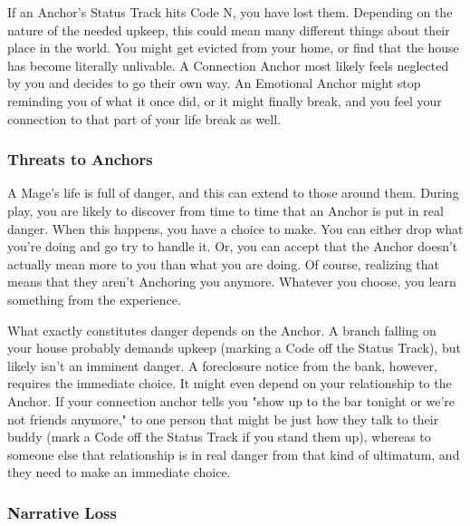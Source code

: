 \documentclass[
  oneside,
  statementpaper,
  9pt]{memoir}
\begin{document}
\begin{Player}

If an Anchor’s Status Track hits Code N, you have lost them. Depending on the nature of the needed upkeep, this could mean many different things about their place in the world. You might get evicted from your home, or find that the house has become literally unlivable. A Connection Anchor most likely feels neglected by you and decides to go their own way. An Emotional Anchor might stop reminding you of what it once did, or it might finally break, and you feel your connection to that part of your life break as well.

\end{Player}

\hypertarget{threats-to-anchors}{%
\subsubsection{Threats to Anchors}\label{threats-to-anchors}}

\begin{Player}

A Mage’s life is full of danger, and this can extend to those around them. During play, you are likely to discover from time to time that an Anchor is put in real danger. When this happens, you have a choice to make. You can either drop what you’re doing and go try to handle it. Or, you can accept that the Anchor doesn’t actually mean more to you than what you are doing. Of course, realizing that means that they aren’t Anchoring you anymore. Whatever you choose, you learn something from the experience.

What exactly constitutes danger depends on the Anchor. A branch falling on your house probably demands upkeep (marking a Code off the Status Track), but likely isn’t an imminent danger. A foreclosure notice from the bank, however, requires the immediate choice. It might even depend on your relationship to the Anchor. If your connection anchor tells you "show up to the bar tonight or we’re not friends anymore," to one person that might be just how they talk to their buddy (mark a Code off the Status Track if you stand them up), whereas to someone else that relationship is in real danger from that kind of ultimatum, and they need to make an immediate choice.

\end{Player}

\hypertarget{narrative-loss}{%
\subsubsection{Narrative Loss}\label{narrative-loss}}
\end{document}

